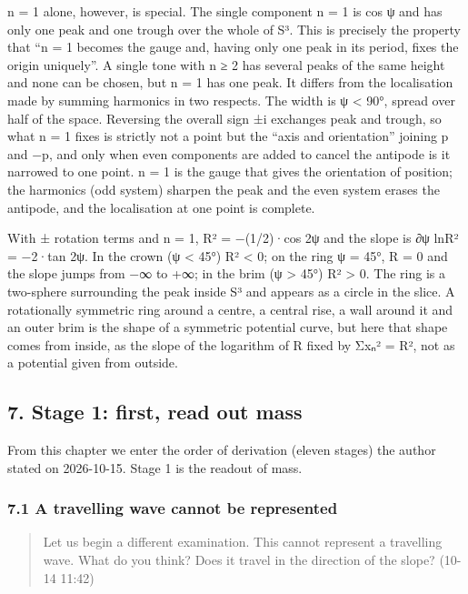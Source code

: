 \documentclass[
  a4paper,
]{article}
\newcounter{none} %
\begin{document}
n = 1 alone, however, is special. The single component n = 1 is cos ψ
and has only one peak and one trough over the whole of S³. This is
precisely the property that ``n = 1 becomes the gauge and, having only
one peak in its period, fixes the origin uniquely''. A single tone with
n ≥ 2 has several peaks of the same height and none can be chosen, but n
= 1 has one peak. It differs from the localisation made by summing
harmonics in two respects. The width is ψ \textless{} 90°, spread over
half of the space. Reversing the overall sign ±i exchanges peak and
trough, so what n = 1 fixes is strictly not a point but the ``axis and
orientation'' joining p and −p, and only when even components are added
to cancel the antipode is it narrowed to one point. n = 1 is the gauge
that gives the orientation of position; the harmonics (odd system)
sharpen the peak and the even system erases the antipode, and the
localisation at one point is complete.

With ± rotation terms and n = 1, R² = −(1/2)·cos 2ψ and the slope is ∂ψ
ln\textbar R²\textbar{} = −2·tan 2ψ. In the crown (ψ \textless{} 45°) R²
\textless{} 0; on the ring ψ = 45°, R = 0 and the slope jumps from −∞ to
+∞; in the brim (ψ \textgreater{} 45°) R² \textgreater{} 0. The ring is
a two-sphere surrounding the peak inside S³ and appears as a circle in
the slice. A rotationally symmetric ring around a centre, a central
rise, a wall around it and an outer brim is the shape of a symmetric
potential curve, but here that shape comes from inside, as the slope of
the logarithm of R fixed by Σxₙ² = R², not as a potential given from
outside.

\subsection{7. Stage 1: first, read out
mass}\label{stage-1-first-read-out-mass}

From this chapter we enter the order of derivation (eleven stages) the
author stated on 2026-10-15. Stage 1 is the readout of mass.

\subsubsection{7.1 A travelling wave cannot be
represented}\label{a-travelling-wave-cannot-be-represented}

\begin{quote}
Let us begin a different examination. This cannot represent a travelling
wave. What do you think? Does it travel in the direction of the slope?
(10-14 11:42)
\end{quote}
\end{document}
